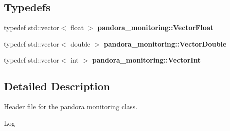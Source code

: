 \subsection*{Typedefs}
\begin{CompactItemize}
\item 
typedef std::vector$<$ float $>$ \textbf{pandora\_\-monitoring::Vector\-Float}\label{namespacepandora__monitoring_65def3fb3990a1627d2be1c337477ecb}

\item 
typedef std::vector$<$ double $>$ \textbf{pandora\_\-monitoring::Vector\-Double}\label{namespacepandora__monitoring_6c3c7c49c81acdea56c2c88f6e895c7d}

\item 
typedef std::vector$<$ int $>$ \textbf{pandora\_\-monitoring::Vector\-Int}\label{namespacepandora__monitoring_e3f3631101e4a2c20e35b8702ca270b1}

\end{CompactItemize}


\subsection{Detailed Description}
Header file for the pandora monitoring class. 

\begin{Desc}
\item[Log]\end{Desc}
